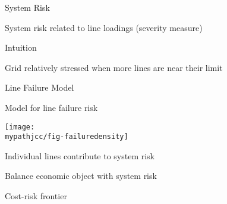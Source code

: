 \begin{frame}{System Risk}

System risk related to line loadings (severity measure) \footnotemark
\pause


\vspace{10pt}
Intuition
\bi
\item Grid relatively stressed when more lines are near their limit
\ei
\end{frame}
\begin{frame}{Line Failure Model}

Model for line failure risk

\begin{center}
\texttt{[image: \\mypathjcc/fig-failuredensity]}
\end{center}
\pause

Individual lines contribute to system risk
\bi
\item Balance economic object with system risk
\item Cost-risk frontier
\ei

\end{frame}




